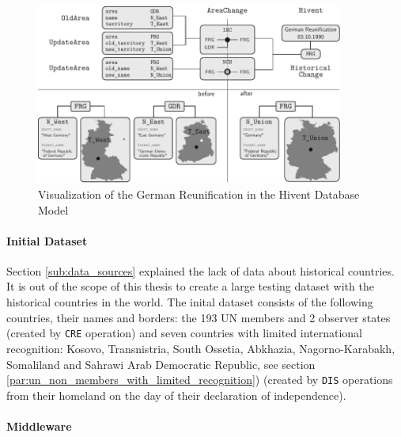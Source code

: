 \begin{figure}[ht]
  \vspace{1em}
  \includegraphics[width=0.9\textwidth]{graphics/development/application/example_reunification}
  \caption{Visualization of the German Reunification in the Hivent Database Model}
  \label{fig:database_example_reunification}
\end{figure}



\paragraph{Initial Dataset} %
\label{par:initial_dataset}

Section \ref{sub:data_sources} explained the lack of data about historical countries. It is out of the scope of this thesis to create a large testing dataset with the historical countries in the world. The inital dataset consists of the following countries, their names and borders: the 193 UN members and 2 observer states (created by \texttt{CRE} operation) and seven countries with limited international recognition: Kosovo, Transnistria, South Ossetia, Abkhazia, Nagorno-Karabakh, Somaliland and Sahrawi Arab Democratic Republic, see section \ref{par:un_non_members_with_limited_recognition}) (created by \texttt{DIS} operations from their homeland on the day of their declaration of independence).


\paragraph{Middleware} %
\label{par:middleware}

